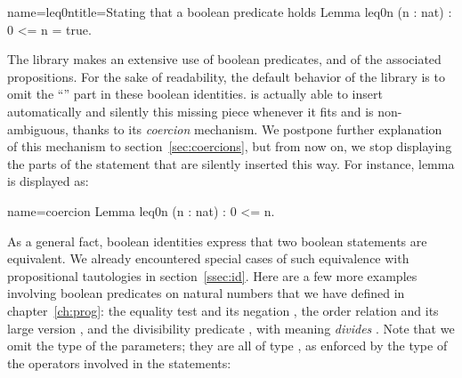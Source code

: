\begin{coq}{name=leq0n}{title=Stating that a boolean predicate holds}
Lemma leq0n (n : nat) : 0 <= n = true.
\end{coq}

%
%

The \mcbMC{} library makes an extensive use of boolean predicates, and
of the associated propositions. For the sake of readability, the
default behavior of the  \mcbMC{} library is to omit the ``''
part in these boolean identities. \Coq{} is actually able to insert
automatically and silently this missing piece whenever it fits and
is non-ambiguous, thanks to its \emph{coercion} mechanism. We
postpone further explanation of this mechanism to
section~\ref{sec:coercions}, but from now on, we stop displaying the
 parts of the statement that are silently inserted this
way. For instance, lemma  is displayed as:

\begin{coq}{name=coercion}{}
Lemma leq0n (n : nat) : 0 <= n.
\end{coq}

As a general fact, boolean identities express that two boolean
statements are equivalent. We already encountered special cases of
such equivalence with propositional tautologies in
section~\ref{ssec:id}. Here are a few more examples involving
boolean predicates on natural numbers that we have defined in
chapter~\ref{ch:prog}: the equality test \C{==} and its negation
\C{!=}, the order relation \C{<} and its large version \C{<=}, and the
divisibility predicate \C{\%|}, with 
meaning  \emph{divides} .
Note that we omit the type of the parameters; they are all of type
, as enforced by the type of the operators involved in the
statements:

